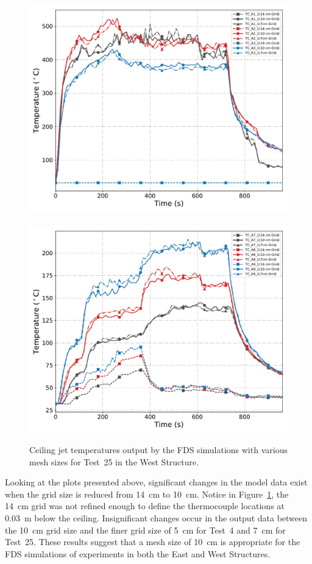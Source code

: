 \begin{figure}[!h]
	\centering
	\includegraphics[width=0.87\columnwidth]{Figures/Plots/Grid_Sensitivity/Temperature/Test_25_cjet_1}
	\\~\\
	\includegraphics[width=0.87\columnwidth]{Figures/Plots/Grid_Sensitivity/Temperature/Test_25_cjet_2}
	\caption[Ceiling jet temperatures for West Structure simulations of various mesh sizes.]{Ceiling jet temperatures output by the FDS simulations with various mesh sizes for Test~25 in the West Structure.}
	\label{fig:west_cjet_sensitivity}
\end{figure}

\FloatBarrier

Looking at the plots presented above, significant changes in the model data exist when the grid size is reduced from 14~cm to 10~cm. Notice in Figure~\ref{fig:west_cjet_sensitivity}, the 14~cm grid was not refined enough to define the thermocouple locations at 0.03~m below the ceiling. Insignificant changes occur in the output data between the 10~cm grid size and the finer grid size of 5~cm for Test~4 and 7~cm for Test~25. These results suggest that a mesh size of 10~cm is appropriate for the FDS simulations of experiments in both the East and West Structures.

